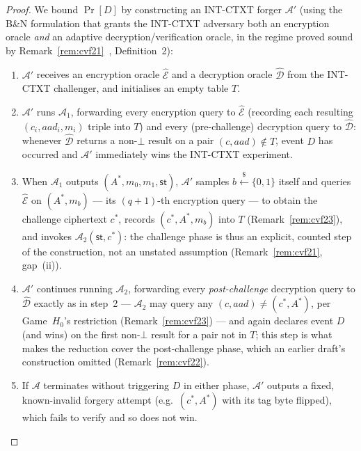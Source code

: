\documentclass[11pt,a4paper]{article}
\begin{document}
\begin{proof}
We bound $\Pr[D]$ by constructing an INT-CTXT forger $\mathcal{A}'$ (using
the B\&N formulation that grants the INT-CTXT adversary both an encryption
oracle \emph{and} an adaptive decryption/verification oracle, in the
regime proved sound by Remark~\ref{rem:cvf21}~\cite{bellare2000ae},
Definition~2):
\begin{enumerate}
  \item $\mathcal{A}'$ receives an encryption oracle $\hat{\mathcal{E}}$ and a
        decryption oracle $\hat{\mathcal{D}}$ from the INT-CTXT challenger,
        and initialises an empty table $T$.
  \item $\mathcal{A}'$ runs $\mathcal{A}_1$, forwarding every encryption
        query to $\hat{\mathcal{E}}$ (recording each resulting
        $(c_i, aad_i, m_i)$ triple into $T$) and every (pre-challenge)
        decryption query to $\hat{\mathcal{D}}$: whenever $\hat{\mathcal{D}}$
        returns a non-$\bot$ result on a pair $(c,aad)\notin T$, event $D$
        has occurred and $\mathcal{A}'$ immediately wins the INT-CTXT
        experiment.
  \item When $\mathcal{A}_1$ outputs $(A^*, m_0, m_1, \mathsf{st})$,
        $\mathcal{A}'$ samples $b \xleftarrow{\$} \{0,1\}$ itself and
        queries $\hat{\mathcal{E}}$ on $(A^*, m_b)$ --- its
        $(q\!+\!1)$-th encryption query --- to obtain the challenge
        ciphertext $c^*$, records $(c^*, A^*, m_b)$ into $T$
        (Remark~\ref{rem:cvf23}), and invokes $\mathcal{A}_2(\mathsf{st},
        c^*)$: the challenge phase is thus an explicit, counted step of
        the construction, not an unstated assumption
        (Remark~\ref{rem:cvf21}, gap~(ii)).
  \item $\mathcal{A}'$ continues running $\mathcal{A}_2$, forwarding
        every \emph{post-challenge} decryption query to $\hat{\mathcal{D}}$
        exactly as in step~2 --- $\mathcal{A}_2$ may query any
        $(c,aad)\neq(c^*,A^*)$, per Game~$H_0$'s restriction
        (Remark~\ref{rem:cvf23}) --- and again declares event $D$ (and
        wins) on the first non-$\bot$ result for a pair not in $T$; this
        step is what makes the reduction cover the post-challenge phase,
        which an earlier draft's construction omitted
        (Remark~\ref{rem:cvf22}).
  \item If $\mathcal{A}$ terminates without triggering $D$ in either
        phase, $\mathcal{A}'$ outputs a fixed, known-invalid forgery
        attempt (e.g.\ $(c^*, A^*)$ with its tag byte flipped), which
        fails to verify and so does not win.

\end{enumerate}
\end{proof}
\end{document}
